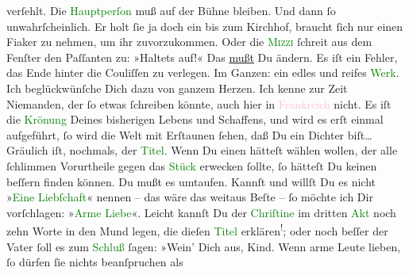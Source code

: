                verſehlt. Die \textcolor{green}{Hauptperſon}{} muß
               auf der Bühne bleiben. Und dann ſo unwahrſcheinlich. {\pb}Er holt ſie ja doch ein\strikeout{;} bis zum Kirchhof, braucht
               ſich nur einen Fiaker zu nehmen, um ihr zuvorzukommen. Oder die \textsc{\textcolor{green}{Mizzi}{}} ſchreit aus dem Fenſter den Paſſanten zu: »Haltets auf!« Das \uline{mußt} Du ändern. Es iſt ein Fehler, das Ende hinter die
               Couliſſen zu verlegen.\pend
           \pstart
           Im Ganzen: ein edles und reifes \textcolor{green}{Werk}{}. Ich beglückwünſche Dich dazu von ganzem Herzen. Ich kenne zur Zeit
               Niemanden, der ſo etwas ſchreiben könnte, auch hier in \textcolor{pink}{Frankreich}{}\ledrightnote{\textcolor{pink}{Frankreich}} nicht. Es iſt die \textcolor{green}{Krönung}{} Deines bisherigen Lebens und Schaffens, {\pb}und wird es erſt einmal aufgeführt, ſo wird die Welt
               mit Erſtaunen ſehen, daß Du ein Dichter biſt{\dots}\pend
           \pstart
           Gräulich iſt, nochmals, der \textcolor{green}{Titel}{}. Wenn Du einen hätteſt wählen wollen, der alle ſchlimmen Vorurtheile
               gegen das \textcolor{green}{Stück}{} erwecken
               ſollte, ſo hätteſt Du keinen beſſern finden können. Du mußt es umtaufen. Kannſt und
               willſt Du es nicht »\textcolor{green}{Eine
                  Liebſchaft}{}« nennen – das wäre das weitaus Beſte – ſo {\pb}möchte ich Dir vorſchlagen: »\textcolor{green}{Arme Liebe}{}«. Leicht  kannſt Du der \textcolor{green}{Chriſtine}{} im dritten \textcolor{green}{Akt}{} noch zehn Worte in den Mund legen, die dieſen \textcolor{green}{Titel}{} erklären\substVorne{}\textsuperscript{!}\substDazwischen{};\substHinten{} oder noch beſſer der Vater ſoll es zum \textcolor{green}{Schluß}{} ſagen: »Wein’ Dich aus,  Kind. Wenn arme Leute lieben, ſo dürfen ſie nichts beanſpruchen als
